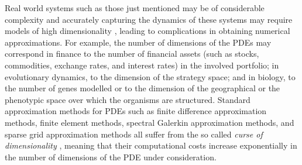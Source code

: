 Real world systems such as those just mentioned may be of considerable complexity and accurately capturing the dynamics of these systems may require models of high dimensionality \citep{Doebeli2010}, leading to complications in obtaining numerical approximations.
For example, the number of dimensions of the PDEs may correspond in finance to the number of financial assets (such as stocks, commodities, exchange rates, and interest rates) in the involved portfolio; in evolutionary dynamics, to the dimension of the strategy space; and in biology, to the number of genes modelled \citep{Pajaro2017} or to the dimension of the geographical or the phenotypic space over which the organisms are structured.
%
Standard approximation methods for PDEs such as finite difference approximation methods, finite element methods, spectral Galerkin approximation methods, and sparse grid approximation methods all suffer from the so called \emph{curse of dimensionality} \citep{Bellman1957}, meaning that their computational costs increase exponentially in the number of dimensions of the PDE under consideration. 

